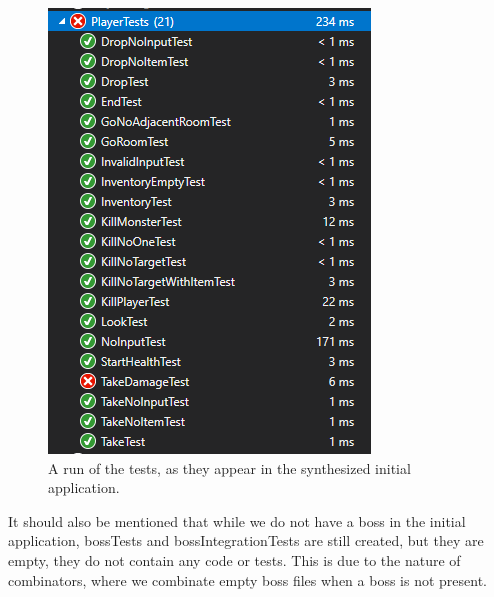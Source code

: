 \begin{figure}
	\centering
	\vspace{-10px}
	\includegraphics[width=\linewidth]{Materials/Results/PlayerUnitTestsInitial}
	\caption{A run of the tests, as they appear in the synthesized initial application.}
	\label{PlayerUnitInit}
\end{figure} 
It should also be mentioned that while we do not have a boss in the initial application, bossTests and bossIntegrationTests are still created, but they are empty, they do not contain any code or tests. This is due to the nature of combinators, where we combinate empty boss files when a boss is not present. \\
